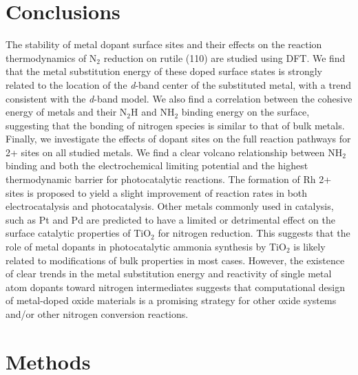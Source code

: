 \section{Conclusions}
The stability of metal dopant surface sites and their effects on the reaction thermodynamics of N$_2$ reduction on rutile (110) are studied using DFT. We find that the metal substitution energy of these doped surface states is strongly related to the location of the \textit{d}-band center of the substituted metal, with a trend consistent with the \textit{d}-band model. We also find a correlation between the cohesive energy of metals and their N$_2$H and NH$_2$ binding energy on the surface, suggesting that the bonding of nitrogen species is similar to that of bulk metals. Finally, we investigate the effects of dopant sites on the full reaction pathways for 2+ sites on all studied metals. We find a clear volcano relationship between NH$_2$ binding and both the electrochemical limiting potential and the highest thermodynamic barrier for photocatalytic reactions. The formation of Rh 2+ sites is proposed to yield a slight improvement of reaction rates in both electrocatalysis and photocatalysis. Other metals commonly used in catalysis, such as Pt and Pd are predicted to have a limited or detrimental effect on the surface catalytic properties of TiO$_2$ for nitrogen reduction. This suggests that the role of metal dopants in photocatalytic ammonia synthesis by TiO$_2$ is likely related to modifications of bulk properties in most cases. However, the existence of clear trends in the metal substitution energy and reactivity of single metal atom dopants toward nitrogen intermediates suggests that computational design of metal-doped oxide materials is a promising strategy for other oxide systems and/or other nitrogen conversion reactions.




\section{Methods}
\label{sec:methods}

